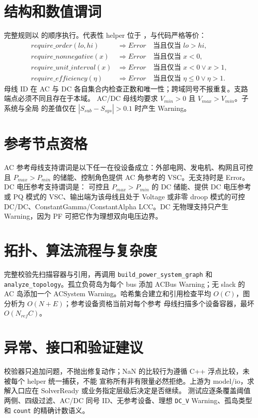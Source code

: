 \documentclass[UTF8,fontset=fandol,a4paper,11pt]{ctexart}
\begin{document}
\section{结构和数值谓词}
完整规则以  的顺序执行。代表性 helper 位于
，与代码严格等价：
\begin{align}
require\_order(lo,hi)&\Rightarrow Error\quad\text{当且仅当 }lo>hi,\\
require\_nonnegative(x)&\Rightarrow Error\quad\text{当且仅当 }x<0,\\
require\_unit\_interval(x)&\Rightarrow Error\quad\text{当且仅当 }x<0\lor x>1,\\
require\_efficiency(\eta)&\Rightarrow Error\quad\text{当且仅当 }\eta\le0\lor\eta>1.
\end{align}
母线 ID 在 AC 与 DC 各自集合内检查正数和唯一性；跨域同号不报重复。支路端点必须不同且存在于本域。
AC/DC 母线均要求 $V_{min}>0$ 且 $V_{max}>V_{min}$。子系统与全局
 的差值仅在 $|S_{sub}-S_{sys}|>0.1$ 时产生 Warning。

\section{参考节点资格}
AC 参考母线支持谓词是以下任一在役设备成立：外部电网、发电机、构网且可控且
$P_{max}>P_{min}$ 的储能、控制角色提供 AC 角参考的 VSC。无支持时是 Error。DC 电压参考支持谓词是：
可控且 $P_{max}>P_{min}$ 的 DC 储能、提供 DC 电压参考或 PQ 模式的 VSC、输出端为该母线且处于 Voltage
或非零 droop 模式的可控 DC/DC、ConstantGamma/ConstantAlpha LCC。DC 无物理支持只产生 Warning，因为
PF 可把它作为理想双向电压边界。

\section{拓扑、算法流程与复杂度}
完整校验先扫描容器与引用，再调用 \texttt{build\_power\_system\_graph} 和
\texttt{analyze\_topology}。孤立负荷岛为每个 bus 添加 ACBus Warning；无 slack 的 AC 岛添加一个
ACSystem Warning。哈希集合建立和引用检查平均 $O(C)$，图分析为 $O(N+E)$；参考设备资格当前对每个参考
母线扫描多个设备容器，最坏 $O(N_{ref}C)$。

\section{异常、接口和验证建议}
校验器只追加问题，不抛出修复动作；NaN 的比较行为遵循 C++ 浮点比较，未被每个 helper 统一捕获，不能
宣称所有非有限量必然拒绝。上游为 model/io，求解入口应在 SolverReady 或业务指定层级后决定是否继续。
测试应逐条覆盖阈值两侧、四级过滤、AC/DC 同号 ID、无参考设备、理想 \texttt{DC\_V} Warning、孤岛类型和
\texttt{count} 的精确计数语义。
\end{document}
